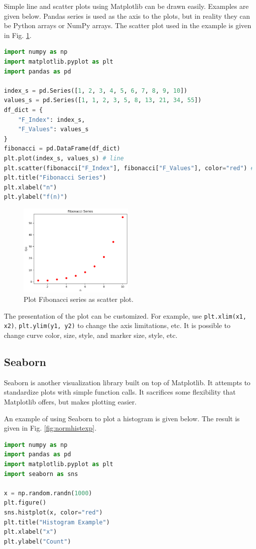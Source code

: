Simple line and scatter plots using Matplotlib can be drawn easily. Examples are given below. Pandas series is used as the axis to the plots, but in reality they can be Python arrays or NumPy arrays. The scatter plot used in the example is given in Fig. \ref{fig:fib_exp}.
\begin{lstlisting}[language=Python]
import numpy as np
import matplotlib.pyplot as plt
import pandas as pd

index_s = pd.Series([1, 2, 3, 4, 5, 6, 7, 8, 9, 10])
values_s = pd.Series([1, 1, 2, 3, 5, 8, 13, 21, 34, 55])
df_dict = {
	"F_Index": index_s,
	"F_Values": values_s
}
fibonacci = pd.DataFrame(df_dict)
plt.plot(index_s, values_s) # line
plt.scatter(fibonacci["F_Index"], fibonacci["F_Values"], color="red") # scatter
plt.title("Fibonacci Series")
plt.xlabel("n")
plt.ylabel("f(n)")
\end{lstlisting}

\begin{figure}[htbp]
\centering
\includegraphics[width=0.5\textwidth]{chapters/part-3/figures/fib_exp.png}
\caption{Plot Fibonacci series as scatter plot.}
\label{fig:fib_exp}
\end{figure}

The presentation of the plot can be customized. For example, use \verb|plt.xlim(x1, x2)|, \verb|plt.ylim(y1, y2)| to change the axis limitations, etc. It is possible to change curve color, size, style, and marker size, style, etc.

\subsection{Seaborn}

Seaborn is another visualization library built on top of Matplotlib. It attempts to standardize plots with simple function calls. It sacrifices some flexibility that Matplotlib offers, but makes plotting easier.

An example of using Seaborn to plot a histogram is given below. The result is given in Fig. \ref{fig:normhistexp}.
\begin{lstlisting}[language=Python]
import numpy as np
import pandas as pd
import matplotlib.pyplot as plt
import seaborn as sns

x = np.random.randn(1000)
plt.figure()
sns.histplot(x, color="red")
plt.title("Histogram Example")
plt.xlabel("x")
plt.ylabel("Count")
\end{lstlisting}

